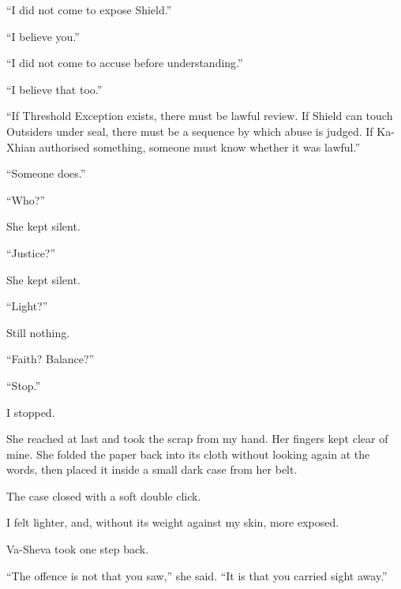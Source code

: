 ``I did not come to expose Shield.''\par

``I believe you.''\par

``I did not come to accuse before understanding.''\par

``I believe that too.''\par

``If Threshold Exception exists, there must be lawful review. If Shield can touch Outsiders under seal, there must be a sequence by which abuse is judged. If Ka-Xhian authorised something, someone must know whether it was lawful.''\par

``Someone does.''\par

``Who?''\par

She kept silent.\par

``Justice?''\par

She kept silent.\par

``Light?''\par

Still nothing.\par

``Faith? Balance?''\par

``Stop.''\par

I stopped.\par

She reached at last and took the scrap from my hand. Her fingers kept clear of mine. She folded the paper back into its cloth without looking again at the words, then placed it inside a small dark case from her belt.\par

The case closed with a soft double click.\par

I felt lighter, and, without its weight against my skin, more exposed.\par

Va-Sheva took one step back.\par

``The offence is not that you saw,'' she said. ``It is that you carried sight away.''\par


